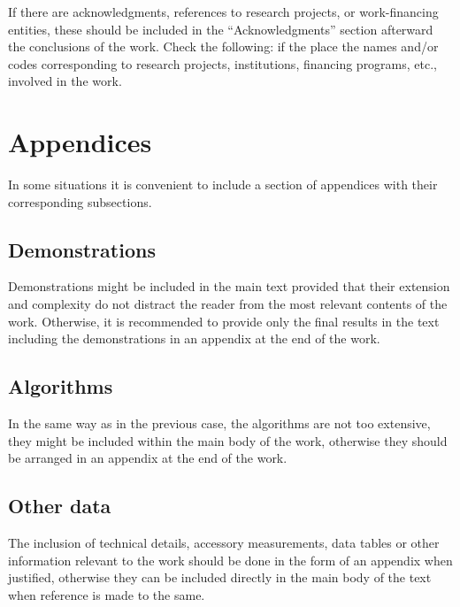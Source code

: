 \documentclass[eng,blind]{ajceam-class}
\begin{document}
If there are acknowledgments, references to research projects, or work-financing entities, these should be included in the ``Acknowledgments'' section afterward the conclusions of the work. Check the following: if the place the names and/or codes corresponding to research projects, institutions, financing programs, etc., involved in the work.

\appendix
\section{Appendices}

In some situations it is convenient to include a section of appendices with their corresponding subsections.

\subsection{Demonstrations}

Demonstrations might be included in the main text provided that their extension and complexity do not distract the reader from the most relevant contents of the work. Otherwise, it is recommended to provide only the final results in the text including the demonstrations in an appendix at the end of the work.

\subsection{Algorithms}

In the same way as in the previous case, the algorithms are not too extensive, they might be included within the main body of the work, otherwise they should be arranged in an appendix at the end of the work.

\subsection{Other data}

The inclusion of technical details, accessory measurements, data tables or other information relevant to the work should be done in the form of an appendix when justified, otherwise they can be included directly in the main body of the text when reference is made to the same.

\end{document}
